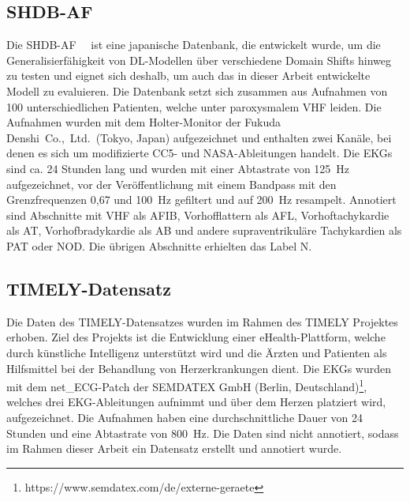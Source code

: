 \subsection*{SHDB-AF}


Die \gls{SHDB-AF}~\cite{tsutsui_shdb-af_2024}~\cite{tsutsui_shdb-af_2024-1} ist eine japanische Datenbank, die entwickelt wurde, um die Generalisierfähigkeit von \gls{DL}-Modellen über verschiedene Domain Shifts hinweg zu testen und eignet sich deshalb, um auch das in dieser Arbeit entwickelte Modell zu evaluieren. Die Datenbank setzt sich zusammen aus Aufnahmen von 100 unterschiedlichen Patienten, welche unter paroxysmalem \gls{VHF} leiden. Die Aufnahmen wurden mit dem Holter-Monitor der Fukuda Denshi~Co.,~Ltd.~(Tokyo, Japan) aufgezeichnet und enthalten zwei Kanäle, bei denen es sich um modifizierte CC5- und NASA-Ableitungen handelt. Die \gls{EKG}s sind ca. 24 Stunden lang und wurden mit einer Abtastrate von 125~Hz aufgezeichnet, vor der Veröffentlichung mit einem Bandpass mit den Grenzfrequenzen 0,67 und 100~Hz gefiltert und auf 200~Hz resampelt. Annotiert sind Abschnitte mit \gls{VHF} als AFIB, Vorhofflattern als AFL, Vorhoftachykardie als AT, Vorhofbradykardie als AB und andere supraventrikuläre Tachykardien als PAT oder NOD. Die übrigen Abschnitte erhielten das Label N. \cite{tsutsui_shdb-af_2024}



\subsection*{TIMELY-Datensatz}



Die Daten des TIMELY-Datensatzes wurden im Rahmen des TIMELY Projektes erhoben. 
Ziel des Projekts ist die Entwicklung einer eHealth-Plattform, welche durch künstliche Intelligenz unterstützt wird 
und die Ärzten und Patienten als Hilfsmittel bei der Behandlung von Herzerkrankungen dient. 
Die \gls{EKG}s wurden mit dem net\_ECG-Patch der SEMDATEX GmbH (Berlin, Deutschland)\footnote{https://www.semdatex.com/de/externe-geraete}, welches drei \gls{EKG}-Ableitungen aufnimmt und über dem Herzen platziert wird, aufgezeichnet. Die Aufnahmen haben eine durchschnittliche Dauer von 24 Stunden und eine Abtastrate von 800~Hz. Die Daten sind nicht annotiert, sodass im Rahmen dieser Arbeit ein Datensatz erstellt und annotiert wurde. \cite{schmitz_patient-centered_2022} \cite{noauthor_patient-centered_nodate}


